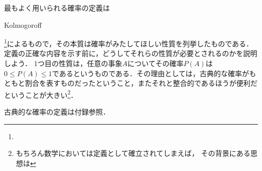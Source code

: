 \documentclass[main.tex]{subfiles}
\begin{document}
最もよく用いられる確率の定義は\begin{german}Kolmogoroff\end{german}\footnote{%
}によるもので，その本質は確率がみたしてほしい性質を列挙したものである．
定義の正確な内容を示す前に，どうしてそれらの性質が必要とされるのかを説明しよう．
1つ目の性質は，任意の事象\(A\)についてその確率\(P(A)\)は\(0 \leq P(A) \leq 1\)であるというものである．その理由としては，古典的な確率がもともと割合を表すものだったということ，またそれと整合的であるほうが便利だということが大きい\footnote{%
もちろん数学においては定義として確立されてしまえば，
その背景にある思想は
}．

古典的な確率の定義\cite{laplace}は付録参照．
\end{document}

